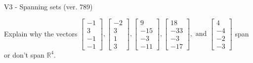\begin{exercise}
  \begin{exerciseTitle}V3 - Spanning sets (ver. 789)\end{exerciseTitle}
  \begin{exerciseStatement}
    Explain why the vectors \(\left[\begin{array}{r}
-1 \\
3 \\
-1 \\
-1
\end{array}\right] , \left[\begin{array}{r}
-2 \\
3 \\
1 \\
3
\end{array}\right] , \left[\begin{array}{r}
9 \\
-15 \\
-3 \\
-11
\end{array}\right] , \left[\begin{array}{r}
18 \\
-33 \\
-3 \\
-17
\end{array}\right] , \text{ and } \left[\begin{array}{r}
4 \\
-4 \\
-2 \\
-3
\end{array}\right]\) span or don't span \(\mathbb{R}^4\). 
	



\end{exerciseStatement}
\end{exercise}
